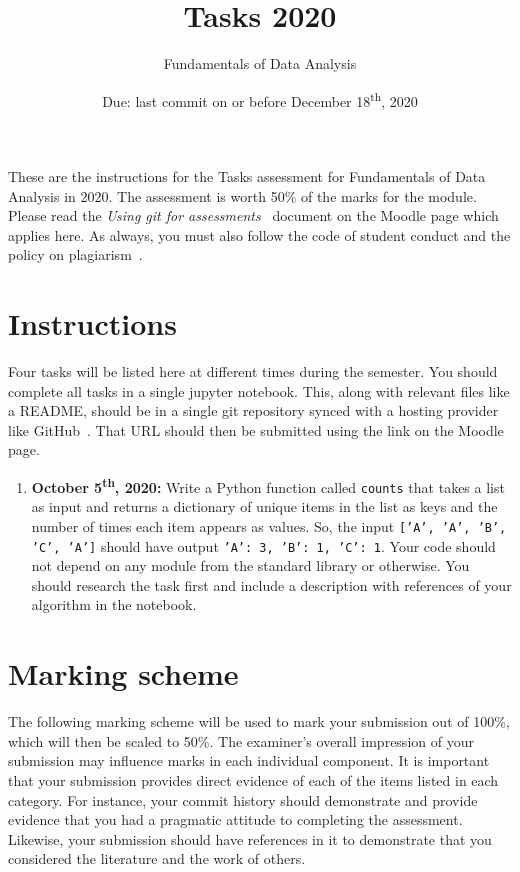 \documentclass[a4paper, 12pt]{scrartcl}
\title{\vspace{-20mm}Tasks 2020}
\author{Fundamentals of Data Analysis}
\date{Due: last commit on or before December 18\textsuperscript{th}, 2020\vspace{-6mm}}
\begin{document}
  
  
  \maketitle

  These are the instructions for the Tasks assessment for Fundamentals of Data Analysis in 2020.
  The assessment is worth 50\% of the marks for the module.
  Please read the \emph{Using git for assessments}~\cite{usinggit} document on the Moodle page which applies here.
  As always, you must also follow the code of student conduct and the policy on plagiarism~\cite{gmitqaf}.

  \section*{Instructions}
  Four tasks will be listed here at different times during the semester.
  You should complete all tasks in a single jupyter notebook.
  This, along with relevant files like a README, should be in a single git repository synced with a hosting provider like GitHub~\cite{github}.
  That URL should then be submitted using the link on the Moodle page.

  \begin{enumerate}
    \item
      \textbf{October 5\textsuperscript{th}, 2020:}
      Write a Python function called \texttt{counts} that takes a list as input and returns a dictionary of unique items in the list as keys and the number of times each item appears as values.
      So, the input \texttt{['A', 'A', 'B', 'C', 'A']} should have output \texttt{{'A': 3, 'B': 1, 'C': 1}}.
      Your code should not depend on any module from the standard library or otherwise.
      You should research the task first and include a description with references of your algorithm in the notebook.
  \end{enumerate}


\newpage

\section*{Marking scheme}
  The following marking scheme will be used to mark your submission out of 100\%, which will then be scaled to 50\%.
  The examiner's overall impression of your submission may influence marks in each individual component.
  It is important that your submission provides direct evidence of each of the items listed in each category.
  For instance, your commit history should demonstrate and provide evidence that you had a pragmatic attitude to completing the assessment.
  Likewise, your submission should have references in it to demonstrate that you considered the literature and the work of others.
\end{document}
